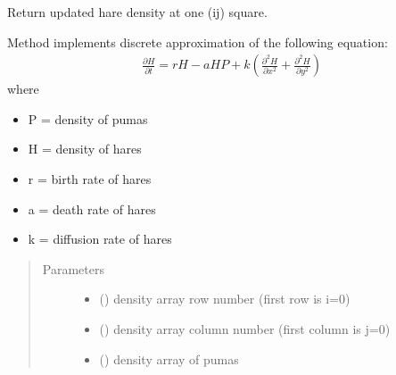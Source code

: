 \documentclass[letterpaper,10pt,english]{sphinxmanual}
\begin{document}
\begin{fulllineitems}
\begin{fulllineitems}
\begin{quote}
\begin{description}
\begin{itemize}
\end{itemize}

\end{description}\end{quote}

\end{fulllineitems}


\begin{fulllineitems}
\label{\detokenize{pumha:pumha.pop.HarePopulation.update_density_ij}}
Return updated hare density at one (ij) square.

Method implements discrete approximation of the following equation:
\begin{equation*}
\begin{split}\frac{\partial H}{\partial t} = rH-aHP+k(\frac{\partial^2 H}             {\partial x^2} + \frac{\partial^2 H}{\partial y^2})\end{split}
\end{equation*}
where
\begin{itemize}
\item {} 
P = density of pumas

\item {} 
H = density of hares

\item {} 
r = birth rate of hares

\item {} 
a = death rate of hares

\item {} 
k = diffusion rate of hares

\end{itemize}
\begin{quote}\begin{description}
\item[{Parameters}] \leavevmode\begin{itemize}
\item {} 
 () \textendash{} density array row number (first row is i=0)

\item {} 
 () \textendash{} density array column number (first column is j=0)

\item {} 
 () \textendash{} density array of pumas


\end{itemize}
\end{description}
\end{quote}
\end{fulllineitems}
\end{fulllineitems}
\end{document}
